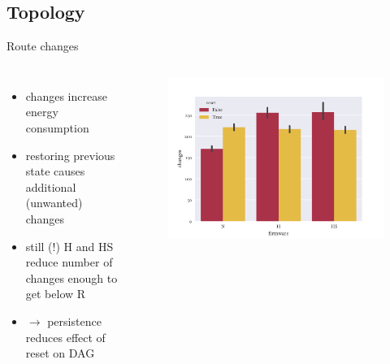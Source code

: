 \documentclass[fleqn,11pt,aspectratio=1610]{beamer}
\begin{document}
\subsection{Topology}
\begin{frame}{Route changes}
  \begin{columns}
    \begin{itemize}
    \item<1-> changes increase \textcolor{tubsRed}{energy consumption}
    \item<2-> restoring previous state causes additional (unwanted) changes
    \item<3-> still (!) H and HS reduce number of changes enough to get below R
    \item<4-> \textcolor{tubsDarkGreen}{$\rightarrow$ persistence reduces effect
        of reset on DAG}
    \end{itemize}
    \begin{figure}
    \centering
    \includegraphics[width=\textwidth]{../images/stability.pdf}
  \end{figure}
  \end{columns}
\end{frame}
\end{document}
